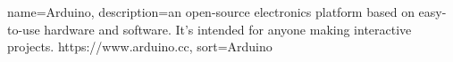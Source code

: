 %
{
  name={Arduino},
  description={an open-source electronics platform based on easy-to-use hardware and software. It's intended for anyone making interactive projects. https://www.arduino.cc},
  sort=Arduino
}
%